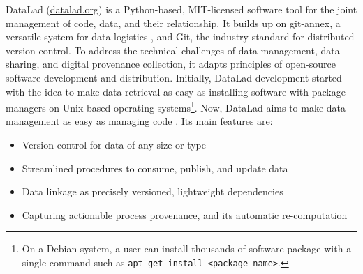 DataLad (\href{http://datalad.org}{datalad.org}) is a Python-based, MIT-licensed software tool for the joint management of code, data, and their relationship.
It builds up on git-annex, a versatile system for data logistics \citep{hessannex}, and Git, the industry standard for distributed version control.
To address the technical challenges of data management, data sharing, and digital provenance collection, it adapts principles of open-source software development and distribution.
Initially, DataLad development started with the idea to make data retrieval as easy as installing software with package managers on Unix-based operating systems\footnote{On a Debian system, a user can install thousands of software package with a single command such as \texttt{apt get install <package-name>}.}.
Now, DataLad aims to make data management as easy as managing code \citep{Halchenko2021}.
Its main features are:
\begin{itemize}
	\item Version control for data of any size or type
	\item Streamlined procedures to consume, publish, and update data
	\item Data linkage as precisely versioned, lightweight dependencies
	\item Capturing actionable process provenance, and its automatic re-computation
\end{itemize}

